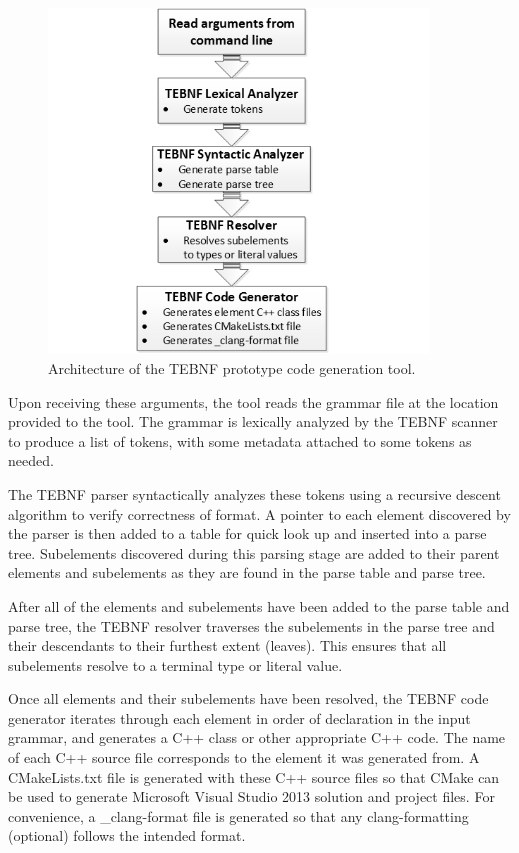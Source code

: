 \begin{figure}[h!]
\centering
\includegraphics[width=0.9\textwidth]{figures/TEBNFCodeGenToolArchitecture.png}
\caption{Architecture of the TEBNF prototype code generation tool.}
\label{fig:TEBNFCodeGenToolArchitecture}
\end{figure}

\indent
Upon receiving these arguments, the tool reads the grammar file at the location provided to the tool.  The grammar is lexically analyzed by the TEBNF scanner to produce a list of tokens, with some metadata attached to some tokens as needed.

\indent
The TEBNF parser syntactically analyzes these tokens using a recursive descent algorithm to verify correctness of format.  A pointer to each element discovered by the parser is then added to a table for quick look up and inserted into a parse tree.  Subelements discovered during this parsing stage are added to their parent elements and subelements as they are found in the parse table and parse tree.

\indent
After all of the elements and subelements have been added to the parse table and parse tree, the TEBNF resolver traverses the subelements in the parse tree and their descendants to their furthest extent (leaves).  This ensures that all subelements resolve to a terminal type or literal value.

\indent
Once all elements and their subelements have been resolved, the TEBNF code generator iterates through each element in order of declaration in the input grammar, and generates a C++ class or other appropriate C++ code.  The name of each C++ source file corresponds to the element it was generated from.  A CMakeLists.txt file is generated with these C++ source files so that CMake can be used to generate Microsoft Visual Studio 2013 solution and project files.  For convenience, a \_clang-format file is generated so that any clang-formatting (optional) follows the intended format.

